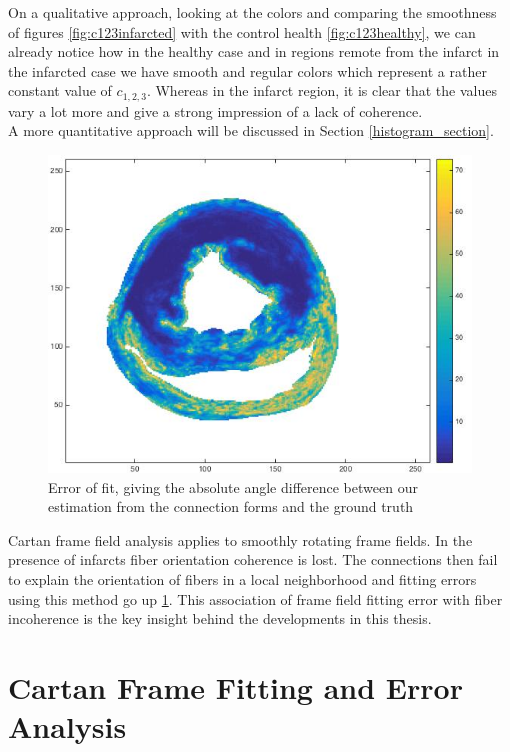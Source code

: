 On a qualitative approach, looking at the colors and comparing the smoothness of figures \ref{fig:c123infarcted} with the control health \ref{fig:c123healthy}, we can already notice how in the healthy case and in regions remote from the infarct in the infarcted case we have smooth and regular colors which represent a rather constant value of $c_{1,2,3}$. Whereas in the infarct region, it is clear that the values vary a lot more and give a strong impression of a lack of coherence.\\
A more quantitative approach will be discussed in Section \ref{histogram_section}.
 
 \begin{figure}
     \centering
     \includegraphics[width=\textwidth]{figures/pig4_error_of_fit_slice_19}
     \caption{Error of fit, giving the absolute angle difference between our estimation from the connection forms and the ground truth}
     \label{fig:error_of_fit}
 \end{figure}
 
Cartan frame field analysis applies to smoothly rotating frame fields. In the presence of infarcts fiber orientation coherence is lost. The connections then fail to explain the orientation of fibers in a local neighborhood and fitting errors using this method go up \ref{fig:error_of_fit}. This association of frame field fitting error with fiber incoherence is the key insight behind the developments in this thesis.

\section{Cartan Frame Fitting and Error Analysis}

